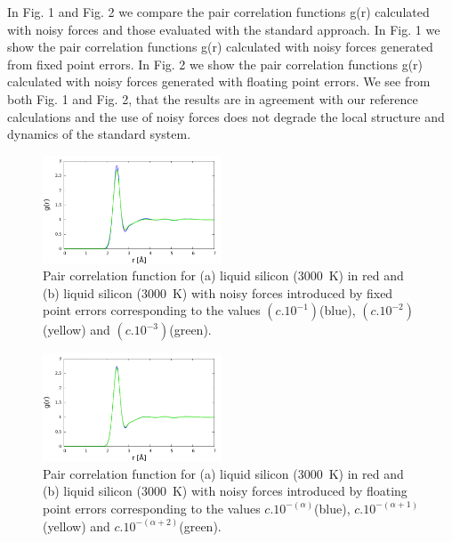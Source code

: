 In Fig. 1 and Fig. 2 we compare the pair correlation functions g(r) calculated with noisy forces and those evaluated with the standard approach. In Fig. 1 we show the pair correlation functions g(r) calculated with noisy forces generated from fixed point errors. In Fig. 2 we show the pair correlation functions g(r) calculated with noisy forces generated with floating point errors. We see from both Fig. 1 and Fig. 2, that the results are in agreement with our reference calculations and the use of noisy forces does not degrade the local structure and dynamics of the standard system. 

\begin{figure}[h!]%
\begin{center}
\includegraphics[width=0.475\textwidth]
{figures/fixedpoint.pdf}
\end{center}
\caption{\label{Fig1}
Pair correlation function for (a) liquid silicon (3000~K) in red and (b) liquid silicon (3000~K) with noisy forces introduced by fixed point errors corresponding to the values \(\left ( c.10^{-1 }\right ) \)(blue), \(\left ( c.10^{-2 }\right ) \)(yellow) and \(\left ( c.10^{-3 } \right ) \)(green).
} \end{figure}

\begin{figure}[h!]%
\begin{center}
\includegraphics[width=0.475\textwidth]
{figures/floatingpoint.pdf}
\end{center}
\caption{\label{Fig2}
Pair correlation function for (a) liquid silicon (3000~K) in red and (b) liquid silicon (3000~K) with noisy forces introduced by floating point errors corresponding to the values \(c.10^{-(\alpha)}\)(blue), \(c.10^{-(\alpha+1)}\)(yellow) and \(c.10^{-(\alpha+2)}\)(green).
} \end{figure}


